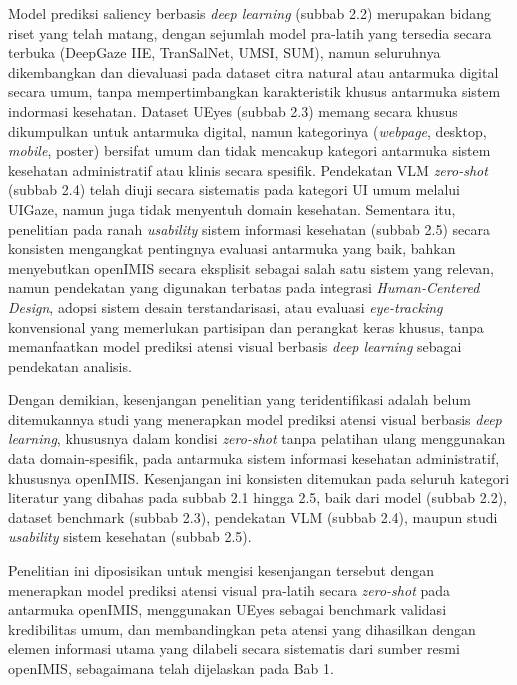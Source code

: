 Model prediksi saliency berbasis \textit{deep learning} (subbab 2.2) merupakan bidang riset yang telah matang, dengan sejumlah model pra-latih yang tersedia secara terbuka (DeepGaze IIE, TranSalNet, UMSI, SUM), namun seluruhnya dikembangkan dan dievaluasi pada dataset citra natural atau antarmuka digital secara umum, tanpa mempertimbangkan karakteristik khusus antarmuka sistem indormasi kesehatan. Dataset UEyes (subbab 2.3) memang secara khusus dikumpulkan untuk antarmuka digital, namun kategorinya (\textit{webpage}, desktop, \textit{mobile}, poster) bersifat umum dan tidak mencakup kategori antarmuka sistem kesehatan administratif atau klinis secara spesifik. Pendekatan VLM \textit{zero-shot} (subbab 2.4) telah diuji secara sistematis pada kategori UI umum melalui UIGaze, namun juga tidak menyentuh domain kesehatan. Sementara itu, penelitian pada ranah \textit{usability} sistem informasi kesehatan (subbab 2.5) secara konsisten mengangkat pentingnya evaluasi antarmuka yang baik, bahkan menyebutkan openIMIS secara eksplisit sebagai salah satu sistem yang relevan, namun pendekatan yang digunakan terbatas pada integrasi \textit{Human-Centered Design}, adopsi sistem desain terstandarisasi, atau evaluasi \textit{eye-tracking} konvensional yang memerlukan partisipan dan perangkat keras khusus, tanpa memanfaatkan model prediksi atensi visual berbasis \textit{deep learning} sebagai pendekatan analisis.

Dengan demikian, kesenjangan penelitian yang teridentifikasi adalah belum ditemukannya studi yang menerapkan model prediksi atensi visual berbasis \textit{deep learning}, khususnya dalam kondisi \textit{zero-shot} tanpa pelatihan ulang menggunakan data domain-spesifik, pada antarmuka sistem informasi kesehatan administratif, khususnya openIMIS. Kesenjangan ini konsisten ditemukan pada seluruh kategori literatur yang dibahas pada subbab 2.1 hingga 2.5, baik dari model (subbab 2.2), dataset benchmark (subbab 2.3), pendekatan VLM (subbab 2.4), maupun studi \textit{usability} sistem kesehatan (subbab 2.5).

Penelitian ini diposisikan untuk mengisi kesenjangan tersebut dengan menerapkan model prediksi atensi visual pra-latih secara \textit{zero-shot} pada antarmuka openIMIS, menggunakan UEyes sebagai benchmark validasi kredibilitas umum, dan membandingkan peta atensi yang dihasilkan dengan elemen informasi utama yang dilabeli secara sistematis dari sumber resmi openIMIS, sebagaimana telah dijelaskan pada Bab 1.


